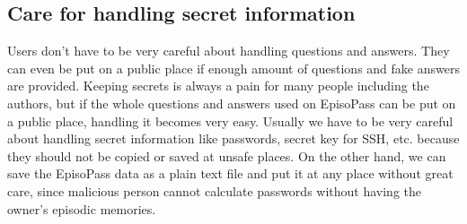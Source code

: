 \documentclass[runningheads,a4paper]{llncs}
\begin{document}
% 
% 
% 

\subsection{Care for handling secret information}

Users don't have to be very careful about handling questions and answers.
They can even be put on a public place
if enough amount of questions and fake answers are provided.
%
Keeping secrets is always a pain for many people including
the authors, but if the whole questions and answers used on EpisoPass
can be put on a public place,
handling it becomes very easy.
Usually we have to be very careful about handling
secret information like passwords, secret key for SSH, etc.
because they should not be copied or saved at unsafe places.
On the other hand,
we can save the EpisoPass data as a plain text file and put it at
any place without great care, since malicious person cannot calculate
passwords without having the owner's episodic memories.
\end{document}
